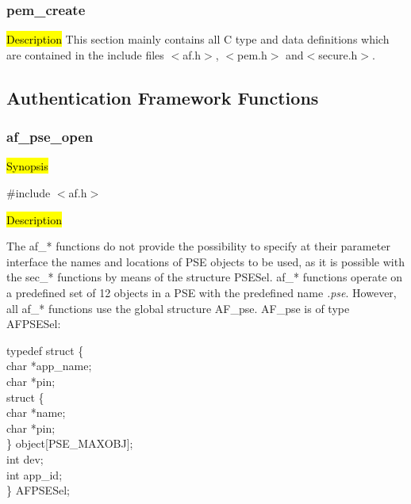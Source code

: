 \subsubsection{pem\_create}
\label{intro5}
\hl{Description}
This section mainly contains all C type and data definitions which are 
contained
in the include files $<$af.h$>$, $<$pem.h$>$ and$<$secure.h$>$.

\subsection{Authentication Framework Functions}         

\subsubsection{af\_pse\_open}

\hl{Synopsis}

\#include $<$af.h$>$

\hl{Description}
     
The af\_* functions do not provide the possibility
to specify at their parameter interface the names and locations of
PSE objects to be used, as it is possible with the sec\_* functions by
means of the structure PSESel. af\_* functions operate on a predefined
set of 12 objects in a PSE with the predefined name {\em .pse}.
However, all af\_* functions use the global structure AF\_pse. AF\_pse is of
type AFPSESel:

{\small
\bvtab
\4 typedef struct \{ \\
\6        char \1    *app\_name; \\
\6        char \1    *pin; \\
\6        struct \{ \\
\8            char \1 *name; \\
\8            char \1 *pin; \\
\6        \}  \1      object[PSE\_MAXOBJ]; \\
\6        int \1     dev; \\
\6        int \1     app\_id; \\
\4 \} AFPSESel; 
\evtab
}


